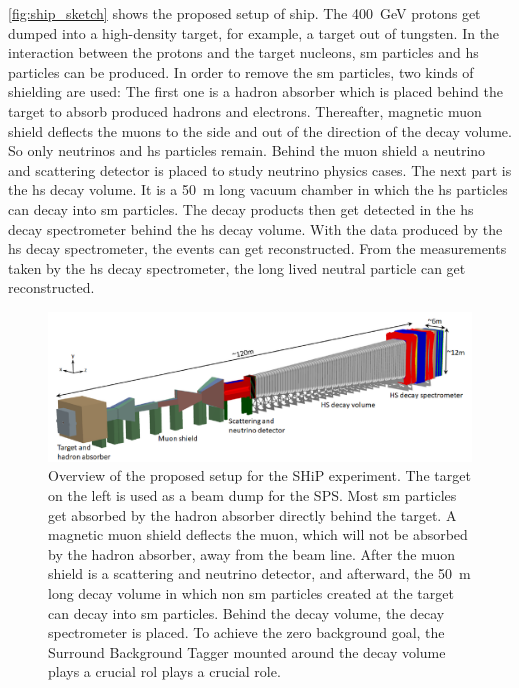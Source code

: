 \autoref{fig:ship_sketch} shows the proposed setup of \ac{ship}.
The \SI{400}{\giga\electronvolt} protons get dumped into a high-density target, for example, a target out of tungsten.
In the interaction between the protons and the target nucleons, \ac{sm} particles and \ac{hs} particles can be produced.
In order to remove the \ac{sm} particles, two kinds of shielding are used:
The first one is a hadron absorber which is placed behind the target to absorb produced hadrons and electrons.
Thereafter, magnetic muon shield deflects the muons to the side and out of the direction of the decay volume.
So only neutrinos and \ac{hs} particles remain.
Behind the muon shield a neutrino and scattering detector is placed to study neutrino physics cases.
The next part is the \ac{hs} decay volume.
It is a \SI{50}{\meter} long vacuum chamber in which the \ac{hs} particles can decay into \ac{sm} particles.
The decay products then get detected in the \ac{hs} decay spectrometer behind the \ac{hs} decay volume.
With the data produced by the \ac{hs} decay spectrometer, the events can get reconstructed.
From the measurements taken by the \ac{hs} decay spectrometer, the long lived neutral particle can get reconstructed.
\begin{figure}
	\centering
	\includegraphics[width=1.\textwidth]{pictures/ship_sketch}
	\caption[Overview of the SHiP experiment.]{Overview of the proposed setup for the SHiP experiment. The target on the left is used as a beam dump for the SPS. Most \ac{sm} particles get absorbed by the hadron absorber directly behind the target. A magnetic muon shield deflects the muon, which will not be absorbed by the hadron absorber, away from the beam line. After the muon shield is a scattering and neutrino detector, and afterward, the \SI{50}{\meter} long decay volume in which non \ac{sm} particles created at the target can decay into \ac{sm} particles. Behind the decay volume, the decay spectrometer is placed. To achieve the zero background goal, the Surround Background Tagger mounted around the decay volume plays a crucial rol plays a crucial role. \cite{ship_coll}}
	\label{fig:ship_sketch}
\end{figure}

